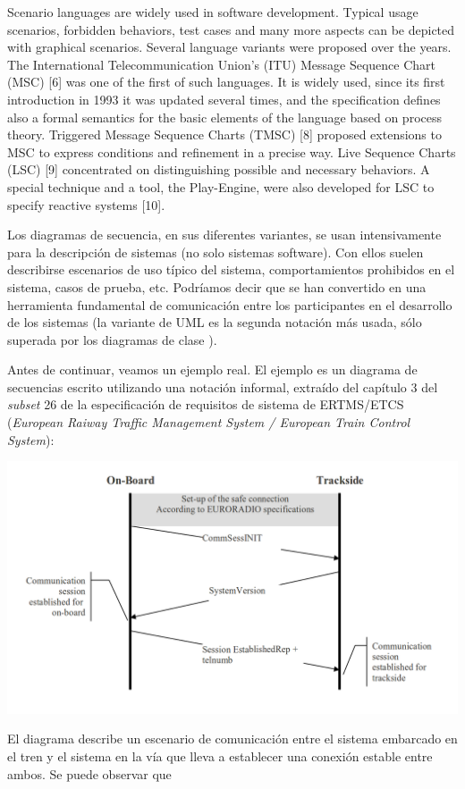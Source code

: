 Scenario languages are widely used in software development. Typical
usage scenarios, forbidden behaviors, test cases and many more aspects
can be depicted with graphical scenarios. Several language variants
were proposed over the years. The International Telecommunication
Union’s (ITU) Message Sequence Chart (MSC) [6] was one of the first of
such languages. It is widely used, since its first introduction in
1993 it was updated several times, and the specification defines also
a formal semantics for the basic elements of the language based on
process theory. Triggered Message Sequence Charts (TMSC) [8] proposed
extensions to MSC to express conditions and refinement in a precise
way. Live Sequence Charts (LSC) [9] concentrated on distinguishing
possible and necessary behaviors. A special technique and a tool, the
Play-Engine, were also developed for LSC to specify reactive systems
[10].

Los diagramas de secuencia, en sus diferentes variantes, se usan
intensivamente para la descripción de sistemas (no solo sistemas
software). Con ellos suelen describirse escenarios de uso típico del
sistema, comportamientos prohibidos en el sistema, casos de prueba,
etc. Podríamos decir que se han convertido en una herramienta
fundamental de comunicación entre los participantes en el desarrollo
de los sistemas (la variante de UML es la segunda notación más usada,
sólo superada por los diagramas de clase
\cite{Dobing:2006:UU:1125944.1125949}).

Antes de continuar, veamos un ejemplo real. El ejemplo es un diagrama
de secuencias escrito utilizando una notación informal, extraído del
capítulo 3 del \emph{subset} 26 de la especificación de requisitos de
sistema de ERTMS/ETCS (\emph{European Raiway Traffic Management System /
  European Train Control System}):
\begin{center}
  \includegraphics[width=0.9\linewidth]{images/ejemplo-ertms.png}
\end{center}
El diagrama describe un escenario de comunicación entre el sistema
embarcado en el tren y el sistema en la vía que lleva a establecer una
conexión estable entre ambos. Se puede observar que 

